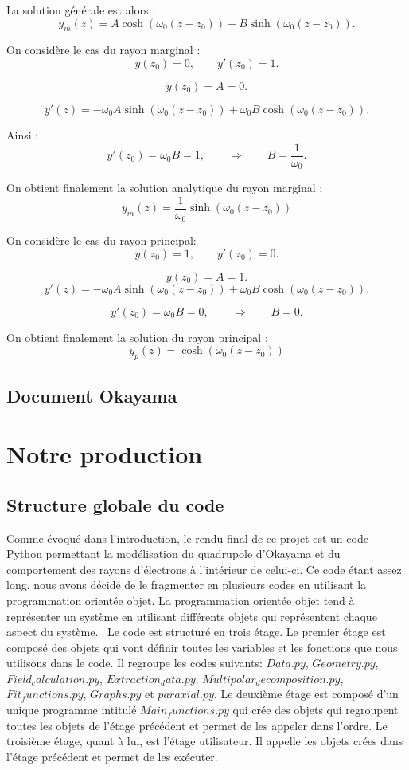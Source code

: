 \documentclass{report}
\begin{document}
La solution générale est alors :
\[
y_m(z) = A \cosh\!\left(\omega_0 (z - z_0)\right)
+ B \sinh\!\left(\omega_0 (z - z_0)\right).
\]

On considère le cas du rayon marginal :
\[
y(z_0) = 0, \qquad y'(z_0) = 1 .
\]

\[
y(z_0) = A = 0 .
\]

\[
y'(z) =
- \omega_0 A \sinh\!\left(\omega_0 (z - z_0)\right)
+ \omega_0 B \cosh\!\left(\omega_0 (z - z_0)\right).
\]

Ainsi :
\[
y'(z_0) = \omega_0 B = 1 ,
\qquad \Rightarrow \qquad
B = \frac{1}{\omega_0}.
\]

On obtient finalement la solution analytique du rayon marginal :
\[
\boxed{
y_m(z) = \frac{1}{\omega_0}
\sinh\!\left(\omega_0 (z - z_0)\right)
}
\]

On considère  le cas du rayon principal:
\[
y(z_0) = 1, \qquad y'(z_0) = 0 .
\]

\[
y(z_0) = A = 1 .
\]
\[
y'(z) =
- \omega_0 A \sinh\!\left(\omega_0 (z - z_0)\right)
+ \omega_0 B \cosh\!\left(\omega_0 (z - z_0)\right).
\]

\[
y'(z_0) = \omega_0 B = 0 , \qquad \Rightarrow \qquad B = 0 .
\]

On obtient finalement la solution  du rayon principal :
\[
\boxed{
y_p(z) = \cosh\!\left(\omega_0 (z - z_0)\right)
}
\]

\section{Document Okayama}

\chapter{Notre production}

\section{Structure globale du code}
Comme évoqué dans l'introduction, le rendu final de ce projet est un code Python permettant la modélisation du quadrupole d'Okayama et du comportement des rayons d'électrons 
à l'intérieur de celui-ci. Ce code étant assez long, nous avons décidé de le fragmenter en plusieurs codes en utilisant la programmation orientée objet. La programmation orientée objet
tend à représenter un système en utilisant différents objets qui représentent chaque aspect du système. 
\
Le code est structuré en trois étage. Le premier étage est composé des objets qui vont définir toutes les variables et les fonctions que nous utilisons dans le code. Il regroupe les codes 
suivants: $Data.py$, $Geometry.py$, $Field_calculation.py$, $Extraction_data.py$, $Multipolar_decomposition.py$, $Fit_functions.py$, $Graphs.py$ et $paraxial.py$.
Le deuxième étage est composé d'un unique programme intitulé $Main_functions.py$ qui crée des objets qui regroupent toutes les objets de l'étage précédent et 
permet de les appeler dans l'ordre. 
Le troisième étage, quant à lui, est l'étage utilisateur. Il appelle les objets crées dans l'étage précédent et permet de les exécuter. 
\end{document}

